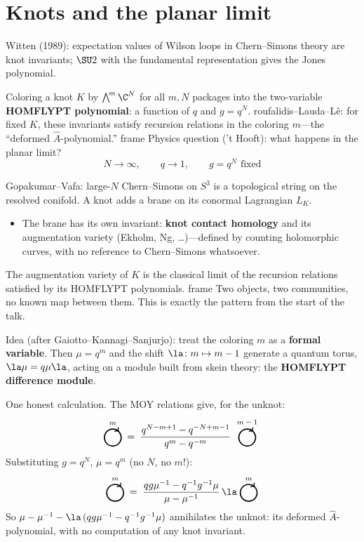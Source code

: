 \documentclass[presentation]{beamer}
\newenvironment{block}
\newenvironment{frame}
\theoremstyle{remark}
\begin{document}
\section{Knots and the planar limit}
\begin{frame}
  Witten (1989): expectation values of Wilson loops in Chern--Simons
  theory are knot invariants; $\SU2$ with the fundamental
  representation gives the Jones polynomial.
  \bigskip

  Coloring a knot $K$ by $\bigwedge^{\!m}\C^N$ for all $m,N$ packages
  into the two-variable {\bf HOMFLYPT polynomial}: a function of $q$
  and $g=q^N$.
  \begin{block}{}
    Garoufalidis--Lauda--L\^e: for fixed $K$, these invariants satisfy
    recursion relations in the coloring $m$---the ``deformed
    $\hat{A}$-polynomial.''
  \end{block}
  Physics question ('t Hooft): what happens in the planar limit?
  \[N\to\infty,\qquad q\to 1,\qquad g=q^N \text{ fixed}\]
\end{frame}

\begin{frame}
  Gopakumar--Vafa: large-$N$ Chern--Simons on $S^3$ is a topological
  string on the resolved conifold.  A knot adds a brane on its
  conormal Lagrangian $L_K$.
  \begin{itemize}
  \item The brane has its own invariant: {\bf knot contact homology}
    and its augmentation variety (Ekholm, Ng, \ldots)---defined by
    counting holomorphic curves, with no reference to Chern--Simons
    whatsoever.
  \end{itemize}
  \begin{block}{Prediction (Aganagi\'c--Vafa)}
    The augmentation variety of $K$ is the classical limit of the
    recursion relations satisfied by its HOMFLYPT polynomials.
  \end{block}
  Two objects, two communities, no known map between them.  This is
  exactly the pattern from the start of the talk.
\end{frame}

\begin{frame}
  Idea (after Gaiotto--Kannagi--Sanjurjo): treat the coloring $m$ as a
  {\bf formal variable}.  Then $\mu=q^m$ and the shift
  $\la\colon m\mapsto m-1$ generate a quantum torus,
  $\la\mu=q\mu\la$, acting on a module built from skein theory: the
  {\bf HOMFLYPT difference module}.
  \bigskip

  One honest calculation.  The MOY relations give, for the unknot:
  \[\knotcirc{m} \;=\;
    \frac{q^{N-m+1}-q^{-N+m-1}}{q^{m}-q^{-m}}\;\knotcirc{m-1}\]
  Substituting $g=q^N$, $\mu=q^m$ (no $N$, no $m$!):
  \[\knotcirc{m}\;=\;\frac{qg\mu^{-1}-q^{-1}g^{-1}\mu}{\mu-\mu^{-1}}\,
    \la\;\knotcirc{m}\]
  So $\mu-\mu^{-1}-\la\,(qg\mu^{-1}-q^{-1}g^{-1}\mu)$ annihilates the
  unknot: its deformed $\hat{A}$-polynomial, with no computation of
  any knot invariant.
\end{frame}
\end{document}
